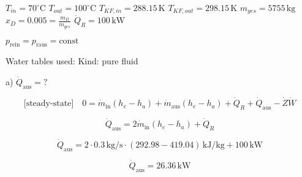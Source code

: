 \( T_{in} = 70^\circ \text{C} \)  
\( T_{out} = 100^\circ \text{C} \)  
\( T_{KF,in} = 288.15 \, \text{K} \)  
\( T_{KF,out} = 298.15 \, \text{K} \)  
\( m_{ges} = 5755 \, \text{kg} \)  
\( x_D = 0.005 = \frac{m_D}{m_{ges}} \)  
\( \dot{Q}_R = 100 \, \text{kW} \)  

\( p_{\text{rein}} = p_{\text{raus}} = \text{const} \)  

Water tables used:  
Kind: pure fluid  

a) \( \dot{Q}_{\text{aus}} = ? \)  

\[ 
\text{[steady-state]} \quad 0 = \dot{m}_{\text{in}} (h_e - h_a) + \dot{m}_{\text{aus}} (h_e - h_a) + \dot{Q}_R + \dot{Q}_{\text{aus}} - \dot{Z} \dot{W} 
\]  

\[ 
\dot{Q}_{\text{aus}} = 2 \dot{m}_{\text{in}} (h_e - h_a) + \dot{Q}_R 
\]  

\[ 
\dot{Q}_{\text{aus}} = 2 \cdot 0.3 \, \text{kg/s} \cdot (292.98 - 419.04) \, \text{kJ/kg} + 100 \, \text{kW} 
\]  

\[ 
\dot{Q}_{\text{aus}} = 26.36 \, \text{kW} 
\]